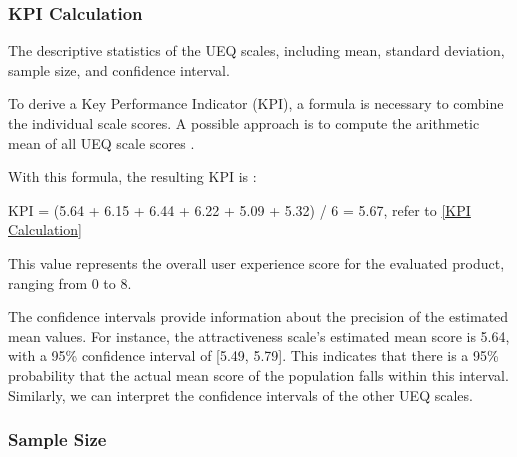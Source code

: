 \documentclass[conference,onecolumn]{IEEEtran}
\begin{document}
            \subsubsection{KPI Calculation}\hfill

            The descriptive statistics of the UEQ scales, including mean, standard deviation, sample size, and confidence interval.

            To derive a Key Performance Indicator (KPI), a formula is necessary to combine the individual scale scores. A possible approach is to compute the arithmetic mean of all UEQ scale scores \cite{laugwitz2008construction}.

            With this formula, the resulting KPI is \cite{laugwitz2008construction}:

            KPI = (5.64 + 6.15 + 6.44 + 6.22 + 5.09 + 5.32) / 6 = 5.67, refer to \figurename{\ref{KPI Calculation}}

            This value represents the overall user experience score for the evaluated product, ranging from 0 to 8.

            The confidence intervals provide information about the precision of the estimated mean values. For instance, the attractiveness scale's estimated mean score is 5.64, with a 95\% confidence interval of [5.49, 5.79]. This indicates that there is a 95\% probability that the actual mean score of the population falls within this interval. Similarly, we can interpret the confidence intervals of the other UEQ scales.

        \subsubsection{Sample Size}\hfill
\end{document}
